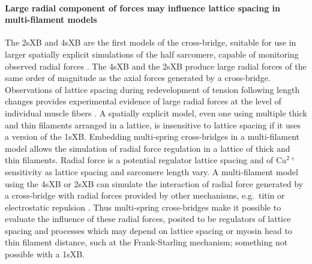 \documentclass[]{article}
\begin{document}
\paragraph{Large radial component of forces may influence lattice spacing in multi-filament models} %
The 2sXB and 4sXB are the first models of the cross-bridge, suitable for use in larger spatially explicit simulations of the half sarcomere, capable of monitoring observed radial forces \citep{Cecchi1990, Millman1998}. 
The 4sXB and the 2sXB produce large radial forces of the same order of magnitude as the axial forces generated by a cross-bridge. 
Observations of lattice spacing during redevelopment of tension following length changes provides experimental evidence of large radial forces at the level of individual muscle fibers \citep{Cecchi1990}. %
A spatially explicit model, even one using multiple thick and thin filaments arranged in a lattice, is insensitive to lattice spacing if it uses a version of the 1sXB\@.  
Embedding multi-spring cross-bridges in a multi-filament model allows the simulation of radial force regulation in a lattice of thick and thin filaments.  
Radial force is a potential regulator lattice spacing and of Ca$^{2+}$ sensitivity as lattice spacing and sarcomere length vary.  
A multi-filament model using the 4sXB or 2sXB can simulate the interaction of radial force generated by a cross-bridge with radial forces provided by other mechanisms, e.g.\ titin or electrostatic repulsion \citep{Martyn2004, Cazorla2001, Millman1998}. 
Thus multi-spring cross-bridges make it possible to evaluate the influence of these radial forces, posited to be regulators of lattice spacing and processes which may depend on lattice spacing or myosin head to thin filament distance, such at the Frank-Starling mechanism; something not possible with a 1sXB\@. 
\end{document}
